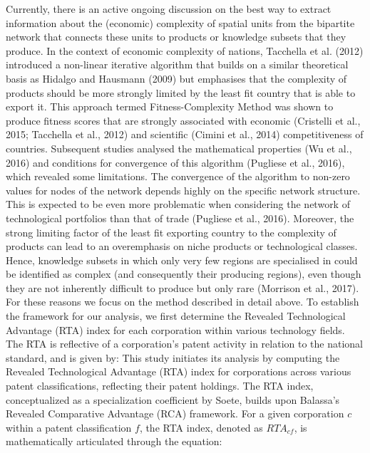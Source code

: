 \documentclass[fleqn,10pt]{wlscirep}
\begin{document}
Currently, there is an active ongoing discussion on the best way to extract information about the (economic) complexity of spatial units from the bipartite network that connects these units to products or knowledge subsets that they produce. In the context of economic complexity of nations, Tacchella et al. (2012) introduced a non-linear iterative algorithm that builds on a similar theoretical basis as Hidalgo and Hausmann (2009) but emphasises that the complexity of products should be more strongly limited by the least fit country that is able to export it. This approach termed Fitness-Complexity Method was shown to produce fitness scores that are strongly associated with economic (Cristelli et al., 2015; Tacchella et al., 2012) and scientific (Cimini et al., 2014) competitiveness of countries. Subsequent studies analysed the mathematical properties (Wu et al., 2016) and conditions for convergence of this algorithm (Pugliese et al., 2016), which revealed some limitations. The convergence of the algorithm to non-zero values for nodes of the network depends highly on the specific network structure. This is expected to be even more problematic when considering the network of technological portfolios than that of trade (Pugliese et al., 2016). Moreover, the strong limiting factor of the least fit exporting country to the complexity of products can lead to an overemphasis on niche products or technological classes. Hence, knowledge subsets in which only very few regions are specialised in could be identified as complex (and consequently their producing regions), even though they are not inherently difficult to produce but only rare (Morrison et al., 2017). For these reasons we focus on the method described in detail above. 
To establish the framework for our analysis, we first determine the Revealed Technological Advantage (RTA) index for each corporation within various technology fields.
The RTA is reflective of a corporation's patent activity in relation to the national standard, and is given by:
This study initiates its analysis by computing the Revealed Technological Advantage (RTA) index for corporations across various patent classifications, reflecting their patent holdings. 
The RTA index, conceptualized as a specialization coefficient by Soete, builds upon Balassa's Revealed Comparative Advantage (RCA) framework. For a given corporation \(c\) within a patent classification \(f\), the RTA index, denoted as \(RTA_{cf}\), is mathematically articulated through the equation:
\end{document}
